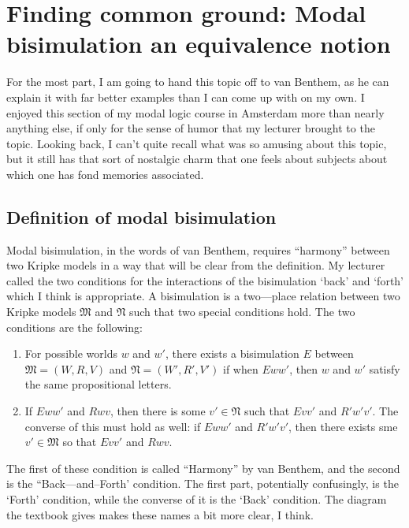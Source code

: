 \chapter[Modal bisimulation]{Finding common ground: Modal bisimulation an equivalence notion}

For the most part, I am going to hand this topic off to van Benthem, as he can explain it with far better examples than I can come
up with on my own. I enjoyed this section of my modal logic course in Amsterdam more than nearly anything else, if only
for the sense of humor that my lecturer brought to the topic. Looking back, I can't quite recall what was so amusing about this
topic, but it still has that sort of nostalgic charm that one feels about subjects about which one has fond memories associated.

\setcounter{section}{-1}

\section{Definition of modal bisimulation}
Modal bisimulation, in the words of van Benthem, requires ``harmony'' between two Kripke models in a way that will be clear from
the definition. My lecturer called the two conditions for the interactions of the bisimulation `back' and `forth' which I think
is appropriate. A bisimulation is a two---place relation between two Kripke models $\mathfrak{M}$ and $\mathfrak{N}$ such that
two special conditions hold.
The two conditions are the following:

\begin{enumerate}
    \item For possible worlds $w$ and $w'$, there exists a bisimulation $E$ between $\mathfrak{M}=(W, R, V)$ and $\mathfrak{N}=(W', R', V')$ if when $Eww'$,
    then $w$ and $w'$ satisfy the same propositional letters.
    \item If $Eww'$ and $Rwv$, then there is some $v' \in \mathfrak{N}$ such that $Evv'$ and $R'w'v'$. The converse of this must hold 
    as well: if $Eww'$ and $R'w'v'$, then there exists sme $v' \in \mathfrak{M}$ so that $Evv'$ and $Rwv$. 
\end{enumerate}

The first of these condition is called ``Harmony'' by van Benthem, and the second is the ``Back---and--Forth' condition. The 
first part, potentially confusingly, is the `Forth' condition, while the converse of it is the `Back' condition. The diagram 
the textbook gives makes these names a bit more clear, I think. 

